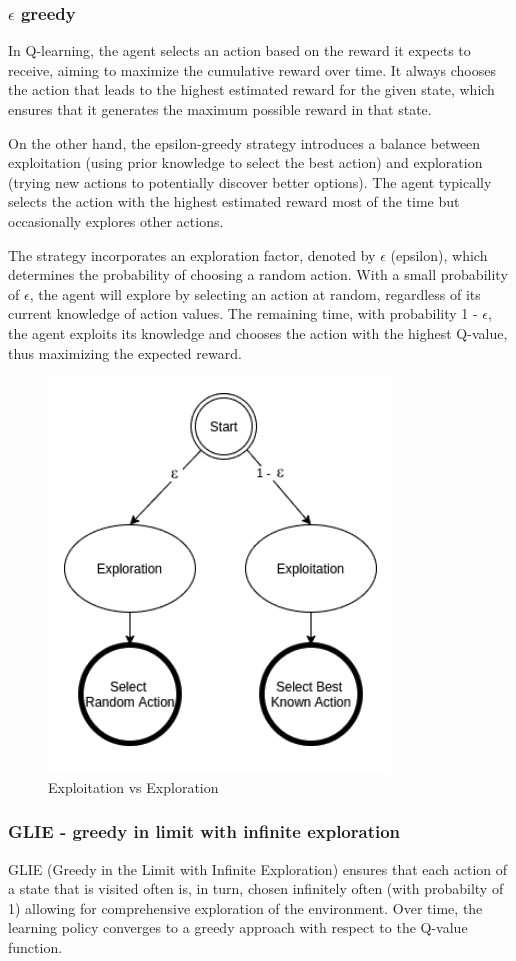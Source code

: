 \documentclass{article}
\begin{document}
\subsubsection{$\epsilon$ greedy}
In Q-learning, the agent selects an action based on the reward it expects to receive, aiming to maximize the cumulative reward over time. It always chooses the action that leads to the highest estimated reward for the given state, which ensures that it generates the maximum possible reward in that state.

On the other hand, the epsilon-greedy strategy introduces a balance between exploitation (using prior knowledge to select the best action) and exploration (trying new actions to potentially discover better options). The agent typically selects the action with the highest estimated reward most of the time but occasionally explores other actions.

The strategy incorporates an exploration factor, denoted by $\epsilon$ (epsilon), which determines the probability of choosing a random action. With a small probability of $\epsilon$, the agent will explore by selecting an action at random, regardless of its current knowledge of action values. The remaining time, with probability 1 - $\epsilon$, the agent exploits its knowledge and chooses the action with the highest Q-value, thus maximizing the expected reward.

\begin{figure}[h]
	\centering
	\includegraphics[width=0.3\linewidth]{../data/images/exp_e.png}
	\caption{Exploitation vs Exploration \cite{q_le}}
	\label{fig:expl}
\end{figure}

\subsubsection{GLIE - greedy in limit with infinite exploration}

GLIE (Greedy in the Limit with Infinite Exploration) ensures that each action of a state that is visited often is, in turn, chosen infinitely often (with probabilty of 1) allowing for comprehensive exploration of the environment. Over time, the learning policy converges to a greedy approach with respect to the Q-value function.
\end{document}
